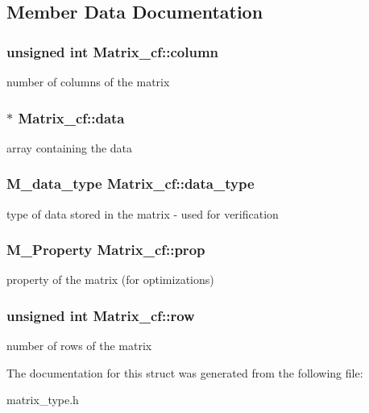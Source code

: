 \subsection{Member Data Documentation}
\subsubsection[{\texorpdfstring{column}{column}}]{\setlength{\rightskip}{0pt plus 5cm}unsigned int Matrix\+\_\+cf\+::column}\hypertarget{structMatrix__cf_ac0522815facf90db76974c3db9645927}{}\label{structMatrix__cf_ac0522815facf90db76974c3db9645927}
number of columns of the matrix 
\subsubsection[{\texorpdfstring{data}{data}}]{$\ast$ Matrix\+\_\+cf\+::data}\hypertarget{structMatrix__cf_a987beffa87c0ed47d1c7b23159c8fd31}{}\label{structMatrix__cf_a987beffa87c0ed47d1c7b23159c8fd31}
array containing the data 
\subsubsection[{\texorpdfstring{data\+\_\+type}{data_type}}]{\setlength{\rightskip}{0pt plus 5cm}M\+\_\+data\+\_\+type Matrix\+\_\+cf\+::data\+\_\+type}\hypertarget{structMatrix__cf_a93b82c3bbbc41c942eaa7891944a1015}{}\label{structMatrix__cf_a93b82c3bbbc41c942eaa7891944a1015}
type of data stored in the matrix -\/ used for verification 
\subsubsection[{\texorpdfstring{prop}{prop}}]{\setlength{\rightskip}{0pt plus 5cm}M\+\_\+\+Property Matrix\+\_\+cf\+::prop}\hypertarget{structMatrix__cf_ae5e94ddc0ac8bd8bebfed98f3da07484}{}\label{structMatrix__cf_ae5e94ddc0ac8bd8bebfed98f3da07484}
property of the matrix (for optimizations) 
\subsubsection[{\texorpdfstring{row}{row}}]{\setlength{\rightskip}{0pt plus 5cm}unsigned int Matrix\+\_\+cf\+::row}\hypertarget{structMatrix__cf_a78fd97baf2f96f5277a90752322fd5a0}{}\label{structMatrix__cf_a78fd97baf2f96f5277a90752322fd5a0}
number of rows of the matrix 

The documentation for this struct was generated from the following file\+:\begin{DoxyCompactItemize}
\item 
matrix\+\_\+type.\+h\end{DoxyCompactItemize}

